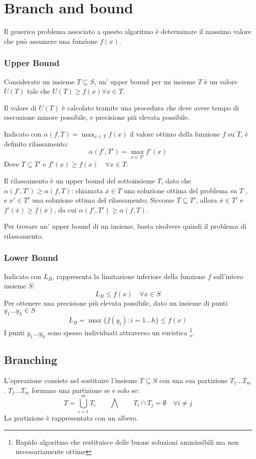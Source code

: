 \documentclass[../template]{subfiles}
\begin{document}
\section{Branch and bound}
Il generico problema associato a questo algoritmo è determinare il massimo valore che può assumere una funzione $f(x)$.
\subsubsection{Upper Bound}
Considerato un insieme $T \subseteq S$, un' upper bound per un insieme $T$ è un valore $U(T)$ tale che $U(T) \ge f(x) \forall x \in
T$.

Il valore di $U(T)$ è calcolato tramite una procedura che deve avere tempo di esecuzione minore possibile, e precisione
più elevata possibile.

Indicato con $\alpha(f, T) = \max_{x\in T} f(x)$ il valore ottimo della funzione $f$ su $T$,
è definito rilassamento:
\[
    \alpha(f', T') = \max_{x \in T'} f'(x)
\]
Dove $T \subseteq T'$ e $f'(x) \ge f(x) \quad \forall x \in T$.

Il rilassamento è un upper bound del sottoinsieme $T$, dato che $\alpha(f', T') \ge \alpha(f, T)$:
chiamata $\bar{x}\in T$ una soluzione ottima del problema su $T$ , e $x' \in T'$ una soluzione ottima del rilassamento;
Siccome $T \subseteq T'$, allora $\bar{x} \in T'$ e $f'(\bar{x}) \ge f(\bar{x})$, da cui $\alpha(f', T') \ge \alpha(f,
T)$.

Per trovare un' upper bound di un insieme, basta risolvere quindi il problema di rilassamento.
\subsubsection{Lower Bound}
Indicato con $L_B$, rappresenta la limitazione inferiore della funzione $f$ sull'intero insieme $S$:
\[
    L_B \le f(x) \quad \forall x \in S
\]
Per ottenere una precisione più elevata possibile, dato un insieme di punti $y_1\dots y_h \in S$
\[
    L_B = \max \big\{f(y_i) : i=1\dots h\big\} \le f(x)
\]
I punti $y_1\dots y_h$ sono spesso individuati attraverso un euristica
\footnote{Rapido algoritmo che restituisce delle buone soluzioni ammissibili ma non necessariamente ottime}.
\subsection{Branching}
L'operazione consiste nel sostituire l'insieme $T \subseteq S$ con una sua partizione $T_1 \dots T_m$.
$T_1\dots T_m$ formano una partizione se e solo se:
\[
    T = \bigcup^m_{i=1}T_i \qquad \bigwedge \qquad T_i \cap T_j = \emptyset \quad \forall i \neq j
\]
La partizione è rappresentata con un albero.
\end{document}
